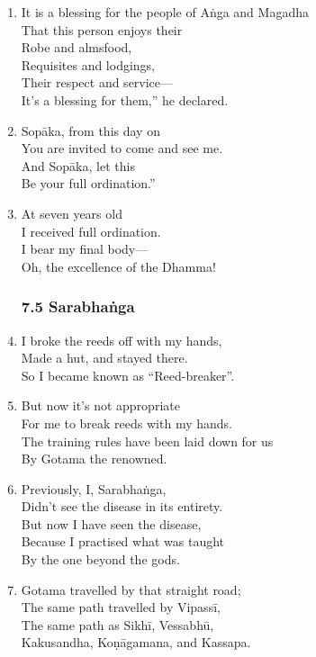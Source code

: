 \documentclass[10pt, openany]{book}
\newcommand*{\vleftofline}[1]{\leavevmode\llap{#1}}
\begin{document}
\begin{enumerate}
\item \vleftofline{“}It is a blessing for the people of Aṅga and Magadha\\
That this person enjoys their\\
Robe and almsfood,\\
Requisites and lodgings,\\
Their respect and service—\\
It’s a blessing for them,” he declared.

\item \vleftofline{“}Sopāka, from this day on\\
You are invited to come and see me.\\
And Sopāka, let this\\
Be your full ordination.”

\item At seven years old\\
I received full ordination.\\
I bear my final body—\\
Oh, the excellence of the Dhamma!

\subsubsection*{7.5 Sarabhaṅga}

\item I broke the reeds off with my hands,\\
Made a hut, and stayed there.\\
So I became known as “Reed-breaker”.

\item But now it’s not appropriate\\
For me to break reeds with my hands.\\
The training rules have been laid down for us\\
By Gotama the renowned.

\item Previously, I, Sarabhaṅga,\\
Didn’t see the disease in its entirety.\\
But now I have seen the disease,\\
Because I practised what was taught \\
By the one beyond the gods.

\item Gotama travelled by that straight road;\\
The same path travelled by Vipassī,\\
The same path as Sikhī, Vessabhū,\\
Kakusandha, Koṇāgamana, and Kassapa.


\end{enumerate}
\end{document}
